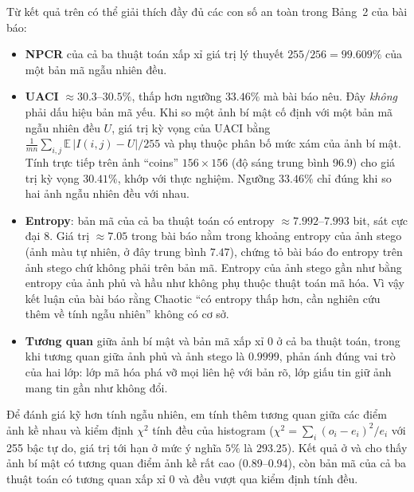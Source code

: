 Từ kết quả trên có thể giải thích đầy đủ các con số an toàn trong Bảng~2 của bài báo:
\begin{itemize}
  \item \textbf{NPCR} của cả ba thuật toán xấp xỉ giá trị lý thuyết $255/256 = 99.609\%$ của một
        bản mã ngẫu nhiên đều.
  \item \textbf{UACI} $\approx 30.3$--$30.5\%$, thấp hơn ngưỡng $33.46\%$ mà bài báo nêu. Đây
        \emph{không} phải dấu hiệu bản mã yếu. Khi so một ảnh bí mật cố định với một bản mã ngẫu
        nhiên đều $U$, giá trị kỳ vọng của UACI bằng
        $\frac{1}{mn}\sum_{i,j}\mathbb{E}\,|I(i,j) - U| / 255$ và phụ thuộc phân bố mức xám của
        ảnh bí mật. Tính trực tiếp trên ảnh ``coins'' $156\times156$ (độ sáng trung bình 96.9) cho
        giá trị kỳ vọng $30.41\%$, khớp với thực nghiệm. Ngưỡng $33.46\%$ chỉ đúng khi so hai ảnh
        ngẫu nhiên đều với nhau.
  \item \textbf{Entropy}: bản mã của cả ba thuật toán có entropy $\approx 7.992$--$7.993$ bit, sát
        cực đại 8. Giá trị $\approx 7.05$ trong bài báo nằm trong khoảng entropy của ảnh stego (ảnh
        màu tự nhiên, ở đây trung bình $7.47$), chứng tỏ bài báo đo entropy trên ảnh stego chứ
        không phải trên bản mã. Entropy của ảnh stego gần như bằng entropy của ảnh phủ và hầu như
        không phụ thuộc thuật toán mã hóa. Vì vậy kết luận của bài báo rằng Chaotic ``có entropy
        thấp hơn, cần nghiên cứu thêm về tính ngẫu nhiên'' không có cơ sở.
  \item \textbf{Tương quan} giữa ảnh bí mật và bản mã xấp xỉ 0 ở cả ba thuật toán, trong khi tương
        quan giữa ảnh phủ và ảnh stego là $0.9999$, phản ánh đúng vai trò của hai lớp: lớp mã hóa
        phá vỡ mọi liên hệ với bản rõ, lớp giấu tin giữ ảnh mang tin gần như không đổi.
\end{itemize}

Để đánh giá kỹ hơn tính ngẫu nhiên, em tính thêm tương quan giữa các điểm ảnh kề nhau và kiểm định
$\chi^2$ tính đều của histogram ($\chi^2 = \sum_i (o_i - e_i)^2/e_i$ với 255 bậc tự do, giá trị
tới hạn ở mức ý nghĩa $5\%$ là $293.25$). Kết quả ở  và  cho
thấy ảnh bí mật có tương quan điểm ảnh kề rất cao (0.89--0.94), còn bản mã của cả ba thuật toán có
tương quan xấp xỉ 0 và đều vượt qua kiểm định tính đều.

